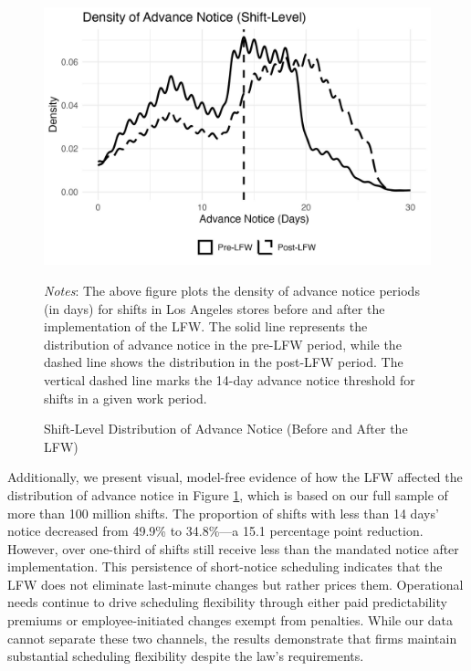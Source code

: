 \documentclass[letterpaper,11pt,leqno]{article}
\theoremstyle{paper}
\newcommand{\note}[2][]{\parbox{\textwidth}{\footnotesize\vspace*{10pt}\textit{#1}#2}}
\begin{document}
\begin{figure}[h]
\centering
\caption{Shift-Level Distribution of Advance Notice (Before and After the LFW)}
\includegraphics[scale=0.20]{Figures_Revision_2/advance_notice_density_la_pre.jpeg}
\note{\scriptsize \singlespacing \textit{Notes}: The above figure plots the density of advance notice periods (in days) for shifts in Los Angeles stores before and after the implementation of the LFW. The solid line represents the distribution of advance notice in the pre-LFW period, while the dashed line shows the distribution in the post-LFW period. The vertical dashed line marks the 14-day advance notice threshold for shifts in a given work period.}
\label{f:adv_notice_plot}
\end{figure}
Additionally, we present visual, model-free evidence of how the LFW affected the distribution of advance notice in Figure \ref{f:adv_notice_plot}, which is based on our full sample of more than 100 million shifts. The proportion of shifts with less than 14 days' notice decreased from 49.9\% to 34.8\%—a 15.1 percentage point reduction. However, over one-third of shifts still receive less than the mandated notice after implementation. This persistence of short-notice scheduling indicates that the LFW does not eliminate last-minute changes but rather prices them. Operational needs continue to drive scheduling flexibility through either paid predictability premiums or employee-initiated changes exempt from penalties. While our data cannot separate these two channels, the results demonstrate that firms maintain substantial scheduling flexibility despite the law's requirements.
\end{document}
